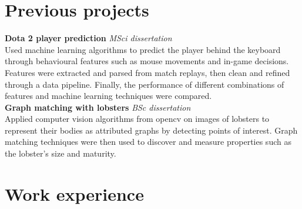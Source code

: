 \documentclass{article}
\newcommand{\n}[0]{\\[\baselineskip]}
\begin{document}
\section*{Previous projects}




\textbf{Dota 2 player prediction} \textit{MSci dissertation} \\
Used machine learning algorithms to predict the player behind the keyboard through 
behavioural features such as mouse movements and in-game decisions. Features were 
extracted and parsed from match replays, then clean and refined through a data pipeline.
Finally, the performance of different combinations of features and machine learning 
techniques were compared.
\\

\textbf{Graph matching with lobsters} \textit{BSc dissertation} \\
Applied computer vision algorithms from opencv on images of lobsters to represent their bodies as
attributed graphs by detecting points of interest. Graph matching techniques were then
used to discover and measure properties such as the lobster's size and maturity.

\section*{Work experience}
\end{document}
